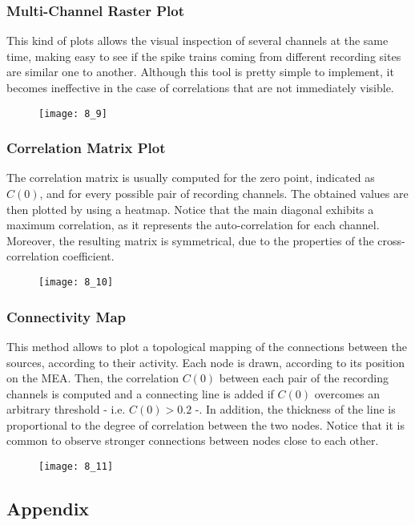 \subsubsection{Multi-Channel Raster Plot}
This kind of plots allows the visual inspection of several channels at the same time, making
easy to see if the spike trains coming from different recording sites are similar one to
another. Although this tool is pretty simple to implement, it becomes ineffective in the
case of correlations that are not immediately visible.
\begin{figure}[H]
    \texttt{[image: 8\_9]}
    \centering
\end{figure}
\subsubsection{Correlation Matrix Plot}
The correlation matrix is usually computed for the zero point, indicated as \(C(0)\), and
for every possible pair of recording channels. The obtained values are then plotted by using
a heatmap. Notice that the main diagonal exhibits a maximum correlation, as it represents
the auto-correlation for each channel. Moreover, the resulting matrix is symmetrical, due to
the properties of the cross-correlation coefficient.
\begin{figure}[H]
    \texttt{[image: 8\_10]}
    \centering
\end{figure}
\subsubsection{Connectivity Map}
This method allows to plot a topological mapping of the connections between the sources,
according to their activity. Each node is drawn, according to its position on the MEA. Then,
the correlation \(C(0)\) between each pair of the recording channels is computed and a
connecting line is added if \(C(0)\) overcomes an arbitrary threshold - i.e. \(C(0)>0.2\) -.
In addition, the thickness of the line is proportional to the degree of correlation between
the two nodes. Notice that it is common to observe stronger connections between nodes close
to each other.
\begin{figure}[H]
    \texttt{[image: 8\_11]}
    \centering
\end{figure}

\subsection{Appendix}

